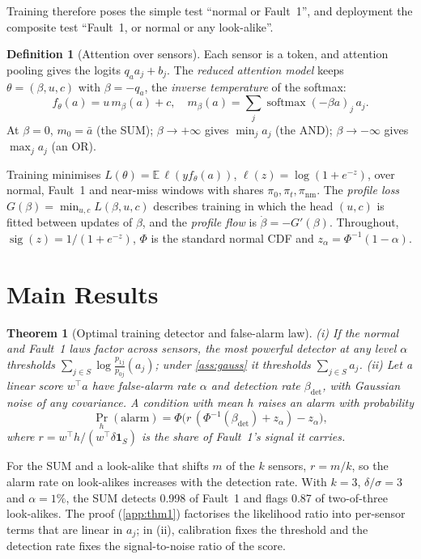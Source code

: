 \documentclass{article}
\theoremstyle{plain}
\newtheorem{theorem}{Theorem}
\theoremstyle{definition}
\newtheorem{definition}{Definition}
\theoremstyle{remark}
\newcommand{\E}{\mathbb{E}}
\newcommand{\one}{\mathbf{1}}
\newcommand{\sig}{\operatorname{sig}}
\newcommand{\softmax}{\operatorname{softmax}}
\newcommand{\nm}{\mathrm{nm}}
\newcommand{\bdet}{\beta_{\mathrm{det}}}
\begin{document}
Training therefore poses the simple test ``normal or Fault~1'', and deployment the composite test ``Fault~1, or normal or any look-alike''.

\begin{definition}[Attention over sensors]\label{def:attn}
Each sensor is a token, and attention pooling gives the logits $q_aa_j+b_j$. The \emph{reduced attention model} keeps $\theta=(\beta,u,c)$ with $\beta=-q_a$, the \emph{inverse temperature} of the softmax:
\[
  f_\theta(a)=u\,m_\beta(a)+c,\quad m_\beta(a)=\textstyle\sum_{j}\softmax(-\beta a)_j\,a_j .
\]
At $\beta=0$, $m_0=\bar a$ (the SUM); $\beta\to+\infty$ gives $\min_ja_j$ (the AND); $\beta\to-\infty$ gives $\max_ja_j$ (an OR).
\end{definition}

Training minimises $L(\theta)=\E\,\ell(yf_\theta(a))$, $\ell(z)=\log(1+e^{-z})$, over normal, Fault~1 and near-miss windows with shares $\pi_0,\pi_t,\pi_\nm$. The \emph{profile loss} $G(\beta)=\min_{u,c}L(\beta,u,c)$ describes training in which the head $(u,c)$ is fitted between updates of $\beta$, and the \emph{profile flow} is $\dot\beta=-G'(\beta)$. Throughout, $\sig(z)=1/(1+e^{-z})$, $\Phi$ is the standard normal CDF and $z_\alpha=\Phi^{-1}(1-\alpha)$.

\section{Main Results}\label{sec:theory}

\begin{theorem}[Optimal training detector and false-alarm law]\label{thm:sum}
(i) If the normal and Fault~1 laws factor across sensors, the most powerful detector at any level $\alpha$ thresholds $\sum_{j\in S}\log\frac{p_{1j}}{p_{0j}}(a_j)$; under \cref{ass:gauss} it thresholds $\sum_{j\in S}a_j$.
(ii) Let a linear score $w^\top a$ have false-alarm rate $\alpha$ and detection rate $\bdet$, with Gaussian noise of any covariance. A condition with mean $h$ raises an alarm with probability
\[
  \Pr_h(\text{alarm})=\Phi\big(r\,(\Phi^{-1}(\bdet)+z_\alpha)-z_\alpha\big),
\]
where $r=w^\top h/(w^\top\delta\one_S)$ is the share of Fault~1's signal it carries.
\end{theorem}

For the SUM and a look-alike that shifts $m$ of the $k$ sensors, $r=m/k$, so the alarm rate on look-alikes increases with the detection rate. With $k=3$, $\delta/\sigma=3$ and $\alpha=1\%$, the SUM detects 0.998 of Fault~1 and flags 0.87 of two-of-three look-alikes. The proof (\cref{app:thm1}) factorises the likelihood ratio into per-sensor terms that are linear in $a_j$; in (ii), calibration fixes the threshold and the detection rate fixes the signal-to-noise ratio of the score.
\end{document}

